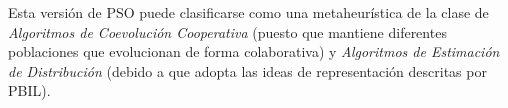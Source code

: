 Esta versión de PSO puede clasificarse como una metaheurística de la clase de \emph{Algoritmos de Coevolución Cooperativa} \cite{Derrac:2009:FSU:1574827.1574906} (puesto que mantiene diferentes poblaciones que evolucionan de forma colaborativa) y \emph{Algoritmos de Estimación de Distribución} (debido a que adopta las ideas de representación descritas por PBIL).
